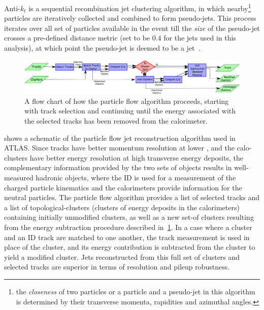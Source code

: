 Anti-$k_t$ is a sequential recombination jet clustering algorithm, in which nearby\footnote{the \textit{closeness} of two particles or a particle and a pseudo-jet in this algorithm is determined by their transverse momenta, rapidities and azimuthal angles.} particles are iteratively collected and combined to form pseudo-jets. This process iterates over all set of particles available in the event till the \textit{size} of the pseudo-jet crosses a pre-defined distance metric (set to be 0.4 for the jets used in this analysis), at which point the pseudo-jet is deemed to be a jet~\cite{anti-kT}.

\begin{figure}[!ht]
    \centering
    \includegraphics[width=\linewidth]{figures//experiment/pflowJets.png}
    \caption{A flow chart of how the particle flow algorithm proceeds, starting with track selection and continuing until the energy associated with the selected tracks has been removed from the calorimeter.~\cite{PERF-2015-09}}
    \label{fig:pflow}
\end{figure}

 shows a schematic of the particle flow jet reconstruction algorithm used in ATLAS. Since tracks have better momentum resolution at lower \pT, and the calo-clusters have better energy resolution at high transverse energy deposits, the complementary information provided by the two sets of objects results in well-measured hadronic objects, where the ID is used for a measurement of the charged particle kinematics and the calorimeters provide information for the neutral particles. The particle flow algorithm provides a list of selected tracks and a list of topological-clusters (clusters of energy deposits in the calorimeters) containing initially unmodified clusters, as well as a new set-of clusters resulting from the energy subtraction procedure described in~\cref{fig:pflow}. In a case where a cluster and an ID track are matched to one another, the track measurement is used in place of the cluster, and its energy contribution is subtracted from the cluster to yield a modified cluster. Jets reconstructed from this full set of clusters and selected tracks are superior in terms of resolution and pileup robustness.